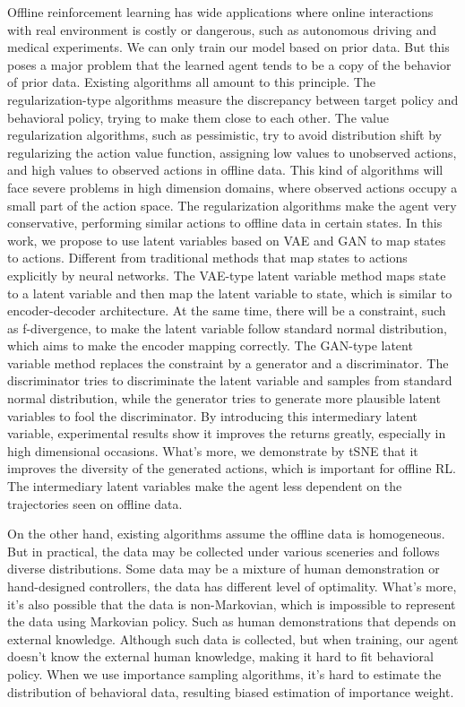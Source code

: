 \documentclass[nohyperref]{article}
\theoremstyle{plain}
\theoremstyle{definition}
\theoremstyle{remark}
\begin{document}
Offline reinforcement learning has wide applications where online interactions with real environment is costly or dangerous, such as autonomous driving and medical experiments. We can only train our model based on prior data. But this poses a major problem that the learned agent tends to be a copy of the behavior of prior data. Existing algorithms all amount to this principle. The regularization-type algorithms measure the discrepancy between target policy and behavioral policy, trying to make them close to each other. The value regularization algorithms, such as pessimistic, try to avoid distribution shift by regularizing the action value function, assigning low values to unobserved actions, and high values to observed actions in offline data. This kind of algorithms will face severe problems in high dimension domains, where observed actions occupy a small part of the action space. The regularization algorithms make the agent very conservative, performing similar actions to offline data in certain states. 
In this work, we propose to use latent variables based on VAE and GAN to map states to actions. Different from traditional methods that map states to actions explicitly by neural networks. The VAE-type latent variable method maps state to a latent variable and then map the latent variable to state, which is similar to encoder-decoder architecture. At the same time, there will be a constraint, such as f-divergence, to make the latent variable follow standard normal distribution, which aims to make the encoder mapping correctly. The GAN-type latent variable method replaces the constraint by a generator and a discriminator. The discriminator tries to discriminate the latent variable and samples from standard normal distribution, while the generator tries to generate more plausible latent variables to fool the discriminator. By introducing this intermediary latent variable, experimental results show it improves the returns greatly, especially in high dimensional occasions. What’s more, we demonstrate by tSNE that it improves the diversity of the generated actions, which is important for offline RL. The intermediary latent variables make the agent less dependent on the trajectories seen on offline data. 

On the other hand, existing algorithms assume the offline data is homogeneous. But in practical, the data may be collected under various sceneries and follows diverse distributions. Some data may be a mixture of human demonstration or hand-designed controllers, the data has different level of optimality. What’s more, it’s also possible that the data is non-Markovian, which is impossible to represent the data using Markovian policy. Such as human demonstrations that depends on external knowledge. Although such data is collected, but when training, our agent doesn’t know the external human knowledge, making it hard to fit behavioral policy. When we use importance sampling algorithms, it’s hard to estimate the distribution of behavioral data, resulting biased estimation of importance weight. 
\end{document}
